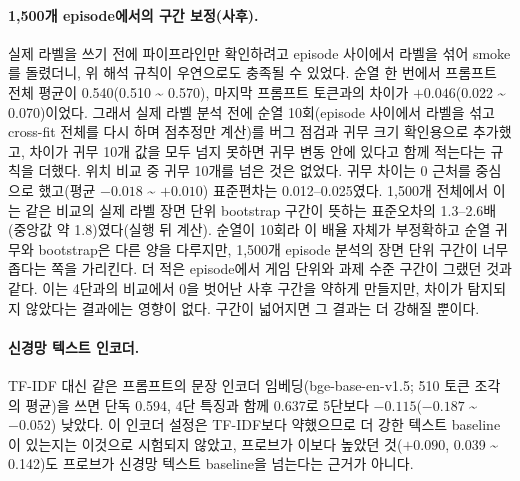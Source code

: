 \documentclass[11pt]{article}
\begin{document}
\paragraph{1,500개 episode에서의 구간 보정(사후).} 실제 라벨을 쓰기 전에 파이프라인만 확인하려고 episode 사이에서 라벨을 섞어 smoke를 돌렸더니, 위 해석 규칙이 우연으로도 충족될 수 있었다. 순열 한 번에서 프롬프트 전체 평균이 0.540(0.510 \textasciitilde{} 0.570), 마지막 프롬프트 토큰과의 차이가 $+0.046$(0.022 \textasciitilde{} 0.070)이었다. 그래서 실제 라벨 분석 전에 순열 10회(episode 사이에서 라벨을 섞고 cross-fit 전체를 다시 하며 점추정만 계산)를 버그 점검과 귀무 크기 확인용으로 추가했고, 차이가 귀무 10개 값을 모두 넘지 못하면 귀무 변동 안에 있다고 함께 적는다는 규칙을 더했다. 위치 비교 중 귀무 10개를 넘은 것은 없었다. 귀무 차이는 0 근처를 중심으로 했고(평균 $-0.018$ \textasciitilde{} $+0.010$) 표준편차는 0.012--0.025였다. 1,500개 전체에서 이는 같은 비교의 실제 라벨 장면 단위 bootstrap 구간이 뜻하는 표준오차의 1.3--2.6배(중앙값 약 1.8)였다(실행 뒤 계산). 순열이 10회라 이 배율 자체가 부정확하고 순열 귀무와 bootstrap은 다른 양을 다루지만, 1,500개 episode 분석의 장면 단위 구간이 너무 좁다는 쪽을 가리킨다. 더 적은 episode에서 게임 단위와 과제 수준 구간이 그랬던 것과 같다. 이는 4단과의 비교에서 0을 벗어난 사후 구간을 약하게 만들지만, 차이가 탐지되지 않았다는 결과에는 영향이 없다. 구간이 넓어지면 그 결과는 더 강해질 뿐이다.

\paragraph{신경망 텍스트 인코더.} TF-IDF 대신 같은 프롬프트의 문장 인코더 임베딩(bge-base-en-v1.5; 510 토큰 조각의 평균)을 쓰면 단독 0.594, 4단 특징과 함께 0.637로 5단보다 $-0.115$($-0.187$ \textasciitilde{} $-0.052$) 낮았다. 이 인코더 설정은 TF-IDF보다 약했으므로 더 강한 텍스트 baseline이 있는지는 이것으로 시험되지 않았고, 프로브가 이보다 높았던 것($+0.090$, 0.039 \textasciitilde{} 0.142)도 프로브가 신경망 텍스트 baseline을 넘는다는 근거가 아니다.
\end{document}
